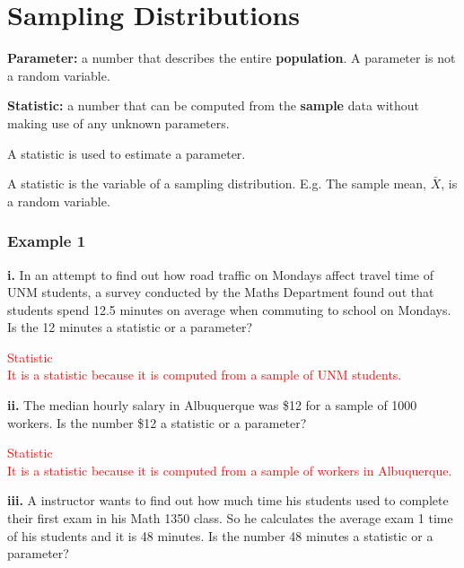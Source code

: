 \chapter{Sampling Distributions}

\textbf{Parameter:} a number that describes the entire \textbf{population}. A parameter is not a random variable.

\vspace{0.2cm}

\noindent \textbf{Statistic:} a number that can be computed from the \textbf{sample} data without making use of any unknown parameters.

\vspace{0.2cm}

\noindent A statistic is used to estimate a parameter.

\vspace{0.2cm}

\noindent A statistic is the variable of a sampling distribution. E.g. The sample mean, $\bar{X}$, is a random variable.

\subsection*{Example 1}

\textbf{i.} In an attempt to find out how road traffic on Mondays affect travel time of UNM students, a survey conducted by the Maths Department found out that students spend 12.5 minutes on average when commuting to school on Mondays. Is the 12 minutes a statistic or a parameter?

\noindent \textcolor{red}{Statistic} \\
\textcolor{red}{It is a statistic because it is computed from a sample of UNM students.}

\vspace{0.2cm}

\textbf{ii.} The median hourly salary in Albuquerque was \$12 for a sample of 1000 workers. Is the number \$12 a statistic or a parameter?

\noindent \textcolor{red}{Statistic} \\
\textcolor{red}{It is a statistic because it is computed from a sample of workers in Albuquerque.}

\vspace{0.2cm}

\textbf{iii.} A instructor wants to find out how much time his students used to complete their first exam in his Math 1350 class. So he calculates the average exam 1 time of his students and it is 48 minutes. Is the number 48 minutes a statistic or a parameter?


